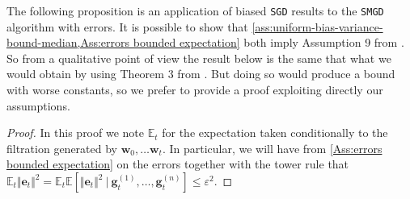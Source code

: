 \documentclass[10pt]{article} %
\newcommand{\bw}{\bm{w}}
\newcommand{\be}{\bm{e}}
\newcommand{\bg}{\bm{g}}
\newcommand{\SGD}{\texttt{SGD}}
\newcommand{\SMGD}{\texttt{SMGD}}
\begin{document}
The following proposition is an application of biased \SGD{} results to the \SMGD{} algorithm with errors.
It is possible to show that \cref{ass:uniform-bias-variance-bound-median,Ass:errors bounded expectation} both imply Assumption 9 from \citet{DemMalSokRic23}.
So from a qualitative point of view the result below is the same that what we would obtain by using Theorem 3 from \citet{DemMalSokRic23}.
But doing so would produce a bound with worse constants, so we prefer to provide a proof exploiting directly our assumptions.


\propapproxmed*
\begin{proof}
    In this proof we note $\mathbb{E}_t$ for the expectation taken conditionally to the filtration generated by $\bw_0, \dots \bw_t$.
    In particular, we will have from \cref{Ass:errors bounded expectation} on the errors together with the tower rule  that $\mathbb{E}_{t} \Vert \be_t \Vert^2 = \mathbb{E}_{t} \mathbb{E}\left[ \Vert \be_t \Vert^2 \ | \ \bg_t^{(1)}, \dots, \bg_t^{(n)} \right]  \leq \varepsilon^2$. 


\end{proof}
\end{document}
